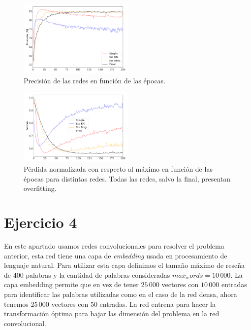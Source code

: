 \begin{figure}[H]
    \begin{small}
        \begin{center}
            \includegraphics[width=0.5\textwidth]{Graphs/ejer3_acc_trails.pdf}
        \end{center}
        \caption{Precisión de las redes en función de las épocas. }
        \label{fig:ejer3_acc_trails}
    \end{small}
\end{figure}


\begin{figure}[H]
    \begin{small}
        \begin{center}
            \includegraphics[width=0.5\textwidth]{Graphs/ejer3_loss_trails.pdf}
        \end{center}
        \caption{Pérdida normalizada con respecto al máximo en función de las épocas para distintas redes. Todas las redes, salvo la final, presentan overfitting. }
        \label{fig:ejer3_los_trails}
    \end{small}
\end{figure}




\section*{Ejercicio 4}

    En este apartado usamos redes convolucionales para resolver el problema anterior, esta red  tiene una capa de \emph{embedding} usada en procesamiento de lenguaje natural. Para utilizar esta capa definimos el tamaño máximo de reseña de $400$ palabras y la cantidad de palabras consideradas $max_words=10\,000$. La capa embedding permite que en vez de tener $25\,000$ vectores con $10\,000$ entradas para identificar las palabras utilizadas como en el caso de la red densa, ahora tenemos $25\,000$ vectores con $50$  entradas. La red entrena para hacer la transformación óptima para bajar las dimensión del problema en la red convolucional.

